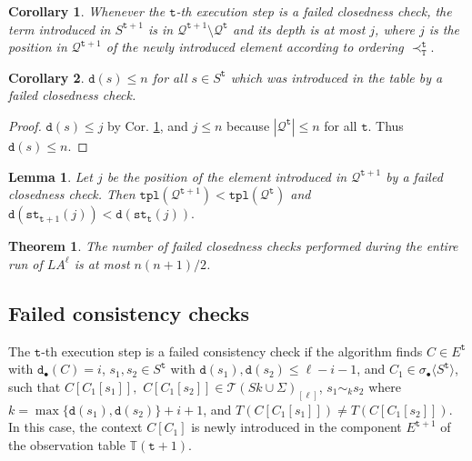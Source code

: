 \documentclass[preprint,12pt,english]{article}
\def\tpl{\mathtt{tpl}}
\def\hole{\bullet}
\def\tty{\mathtt{st}}
\def\cT{\mathcal{T}}
\def\cQ{\mathcal{Q}}
\def\depth{\mathtt{d}}
\newcommand\pair[1]{\langle{#1}\rangle}
\def\ty{\mathtt{t}}
\newtheorem{lemma}{Lemma}
\newtheorem{corollary}{Corollary}
\newtheorem{theorem}{Theorem}
\begin{document}
\begin{corollary}
\label{cor3}
Whenever the $\ty$-th execution step is a failed closedness check, the term introduced in $S^{\ty+1}$ is in $\cQ^{\ty+1}\setminus\cQ^{\ty}$ and its depth is at most $j$, where $j$ is the position in $\cQ^{\ty+1}$ of the newly introduced element  according to  ordering $\prec^\ty_{\mathtt{T}}.$
\end{corollary}

\begin{corollary}
\label{mmon}
$\depth(s)\leq n$ for all $s\in S^\ty$ which was introduced in the table by a failed closedness check.
\end{corollary}
\begin{proof}
$\depth(s)\leq j$ by Cor. \ref{cor3}, and $j\leq n$ because $|\cQ^\ty|\leq n$ for all $\ty$. Thus $\depth(s)\leq n.$ 
\end{proof}
\begin{lemma}
\label{cor4}
Let $j$ be the position of the element  introduced in $\cQ^{\ty+1}$ by a failed closedness check. Then 
$\tpl(\cQ^{\ty+1})<\tpl(\cQ^\ty)$ and $\depth(\tty_{\ty+1}(j))<\depth(\tty_{\ty}(j)).$
\end{lemma}

\begin{theorem}
\label{tyury}
The number of failed closedness checks performed during the entire run of $LA^\ell$ is at most $n(n+1)/2$.
\end{theorem}
\subsection{Failed consistency checks}
The $\ty$-th execution step is a failed consistency check if the algorithm finds  $C\in E^{\ty}$ with $\depth_\hole(C)=i$, $s_1,s_2\in S^{\ty}$ with $\depth(s_1),\depth(s_2)\leq \ell-i-1$, and $C_1\in\sigma_\hole\pair{S^{\ty}}$, such that  $C[C_1[s_1]],$ $C[C_1[s_2]]\in\cT(Sk\cup\Sigma)_{[\ell]}$, $s_1\sim_k s_2$ where $k=\max\{\depth(s_1),\depth(s_2)\}+i+1$, and $T(C[C_1[s_1]])\neq T(C[C_1[s_2]])$. In this case, the context $C[C_1]$ is newly introduced in the component $E^{\ty+1}$ of the observation table $\mathbb{T}({\ty+1})$.
\end{document}
